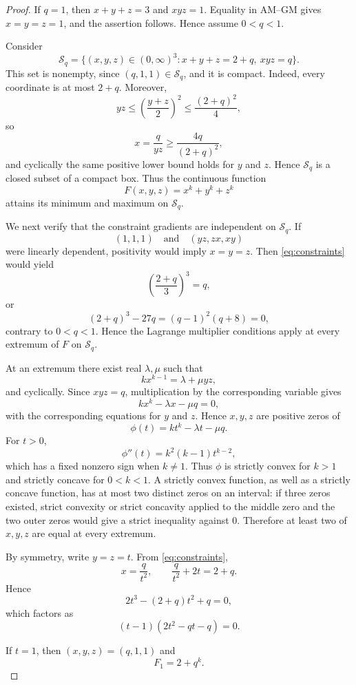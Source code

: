 \documentclass[11pt]{amsart}
\theoremstyle{remark}
\begin{document}
\begin{proof}
If $q=1$, then $x+y+z=3$ and $xyz=1$. Equality in AM--GM gives $x=y=z=1$, and the assertion follows. Hence assume $0<q<1$.

Consider
\[
 \mathcal S_q=\{(x,y,z)\in(0,\infty)^3:x+y+z=2+q,\ xyz=q\}.
\]
This set is nonempty, since $(q,1,1)\in\mathcal S_q$, and it is compact. Indeed, every coordinate is at most $2+q$. Moreover,
\[
 yz\le \left(\frac{y+z}{2}\right)^2\le\frac{(2+q)^2}{4},
\]
so
\[
 x=\frac{q}{yz}\ge\frac{4q}{(2+q)^2},
\]
and cyclically the same positive lower bound holds for $y$ and $z$. Hence $\mathcal S_q$ is a closed subset of a compact box. Thus the continuous function
\[
 F(x,y,z)=x^k+y^k+z^k
\]
attains its minimum and maximum on $\mathcal S_q$.

We next verify that the constraint gradients are independent on $\mathcal S_q$. If
\[
 (1,1,1)\quad\text{and}\quad(yz,zx,xy)
\]
were linearly dependent, positivity would imply $x=y=z$. Then \eqref{eq:constraints} would yield
\[
 \left(\frac{2+q}{3}\right)^3=q,
\]
or
\[
 (2+q)^3-27q=(q-1)^2(q+8)=0,
\]
contrary to $0<q<1$. Hence the Lagrange multiplier conditions apply at every extremum of $F$ on $\mathcal S_q$.

At an extremum there exist real $\lambda,\mu$ such that
\[
 kx^{k-1}=\lambda+\mu yz,
\]
and cyclically. Since $xyz=q$, multiplication by the corresponding variable gives
\[
 kx^k-\lambda x-\mu q=0,
\]
with the corresponding equations for $y$ and $z$. Hence $x,y,z$ are positive zeros of
\[
 \phi(t)=kt^k-\lambda t-\mu q.
\]
For $t>0$,
\[
 \phi''(t)=k^2(k-1)t^{k-2},
\]
which has a fixed nonzero sign when $k\ne1$. Thus $\phi$ is strictly convex for $k>1$ and strictly concave for $0<k<1$. A strictly convex function, as well as a strictly concave function, has at most two distinct zeros on an interval: if three zeros existed, strict convexity or strict concavity applied to the middle zero and the two outer zeros would give a strict inequality against $0$. Therefore at least two of $x,y,z$ are equal at every extremum.

By symmetry, write $y=z=t$. From \eqref{eq:constraints},
\[
 x=\frac{q}{t^2},\qquad \frac{q}{t^2}+2t=2+q.
\]
Hence
\[
 2t^3-(2+q)t^2+q=0,
\]
which factors as
\begin{equation}\label{eq:factor}
 (t-1)(2t^2-qt-q)=0.
\end{equation}

If $t=1$, then $(x,y,z)=(q,1,1)$ and
\begin{equation}\label{eq:F1}
 F_1=2+q^k.
\end{equation}


\end{proof}
\end{document}
